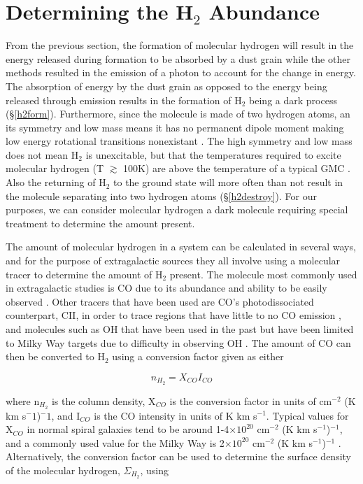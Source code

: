 \section{Determining the H$_2$ Abundance}

From the previous section, the formation of molecular hydrogen will result in the energy released during formation to be absorbed by a dust grain while the other methods resulted in the emission of a photon to account for the change in energy.  The absorption of energy by the dust grain as opposed to the energy being released through emission results in the formation of H$_2$ being a dark process (\S\ref{h2form}).  Furthermore, since the molecule is made of two hydrogen atoms, an its symmetry and low mass means it has no permanent dipole moment making low energy rotational transitions nonexistant \citep{bolatto2013,kennicutt2012}.  The high symmetry and low mass does not mean H$_2$ is unexcitable, but that the temperatures required to excite molecular hydrogen (T $\gtrsim$ 100K) are above the temperature of a typical GMC \citep{bolatto2013}.  Also the returning of H$_2$ to the ground state will more often than not result in the molecule separating into two hydrogen atoms (\S\ref{h2destroy}).  For our purposes, we can consider molecular hydrogen a dark molecule requiring special treatment to determine the amount present.

The amount of molecular hydrogen in a system can be calculated in several ways, and for the purpose of extragalactic sources they all involve using a molecular tracer to determine the amount of H$_2$ present.  The molecule most commonly used in extragalactic studies is CO due to its abundance and ability to be easily observed \citep{bolatto2013}.  Other tracers that have been used are CO's photodissociated counterpart, CII, in order to trace regions that have little to no CO emission \citep{madden1997}, and molecules such as OH that have been used in the past but have been limited to Milky Way targets due to difficulty in observing OH \citep{barrett1964}.  The amount of CO can then be converted to H$_2$ using a conversion factor given as either

\begin{equation}\label{eq:x}
  n_{H_2} = X_{CO} I_{CO}
\end{equation}

where n$_{H_2}$ is the column density, X$_{CO}$ is the conversion factor in units of cm$^{-2}$ (K km s$^-1$)$^-1$, and I$_{CO}$ is the CO intensity in units of K km s$^{-1}$.  Typical values for X$_{CO}$ in normal spiral galaxies tend to be around 1-4$\times 10^{20}$ cm$^{-2}$ (K km s$^{-1}$)$^{-1}$, and a commonly used value for the Milky Way is 2$\times 10^{20}$ cm$^{-2}$ (K km s$^{-1}$)$^{-1}$ \citep{bolatto2013}.  Alternatively, the conversion factor can be used to determine the surface density of the molecular hydrogen, $\Sigma_{H_2}$, using

